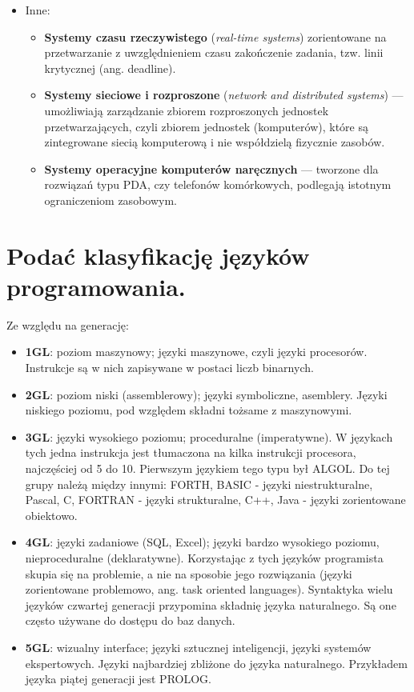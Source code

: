 \documentclass[12pt,a4paper]{article}
\begin{document}
\begin{itemize}
		\item Inne:
		\begin{itemize}
			\item \textbf{Systemy czasu rzeczywistego} (\textit{real-time systems}) zorientowane na przetwarzanie z uwzględnieniem czasu zakończenie zadania, tzw. linii krytycznej (ang. deadline).
			\item \textbf{Systemy sieciowe i rozproszone} (\textit{network and distributed systems}) — umożliwiają zarządzanie zbiorem rozproszonych jednostek przetwarzających, czyli zbiorem jednostek (komputerów), które są zintegrowane siecią komputerową i nie współdzielą fizycznie zasobów.
			\item \textbf{Systemy operacyjne komputerów naręcznych} — tworzone dla rozwiązań typu PDA, czy telefonów komórkowych, podlegają istotnym ograniczeniom zasobowym.
		\end{itemize}
	\end{itemize}

	\section{Podać klasyfikację języków programowania.}
	Ze względu na generację:	
	\begin{itemize}
		\item \textbf{1GL}: poziom maszynowy; języki maszynowe, czyli języki procesorów. Instrukcje są w nich zapisywane w postaci liczb binarnych. 
		\item \textbf{2GL}: poziom niski (assemblerowy); języki symboliczne, asemblery. Języki niskiego poziomu, pod względem składni tożsame z maszynowymi.
		\item \textbf{3GL}: języki wysokiego poziomu; proceduralne (imperatywne). W językach tych jedna instrukcja jest tłumaczona na kilka instrukcji procesora, najczęściej od 5 do 10. Pierwszym językiem tego typu był ALGOL. Do tej grupy należą między innymi: FORTH, BASIC - języki niestrukturalne, Pascal, C, FORTRAN - języki strukturalne, C++, Java - języki zorientowane obiektowo. 
		\item \textbf{4GL}: języki zadaniowe (SQL, Excel);  języki bardzo wysokiego poziomu, nieproceduralne (deklaratywne). Korzystając z tych języków programista skupia się na problemie, a nie na sposobie jego rozwiązania (języki zorientowane problemowo, ang. task oriented languages). Syntaktyka wielu języków czwartej generacji przypomina składnię języka naturalnego. Są one często używane do dostępu do baz danych.
		\item \textbf{5GL}: wizualny interface;  języki sztucznej inteligencji, języki systemów ekspertowych. Języki najbardziej zbliżone do języka naturalnego. Przykładem języka piątej generacji jest PROLOG.
	\end{itemize}
\end{document}
